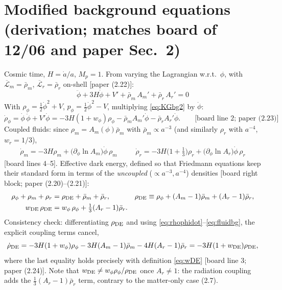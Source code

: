 \documentclass[11pt]{article}
\newcommand{\Lm}{\overline{\mathcal{L}}_{m}}
\newcommand{\Lr}{\overline{\mathcal{L}}_{r}}
\newcommand{\rhob}{\bar\rho}
\newcommand{\Am}{A_{m}}
\newcommand{\Ar}{A_{r}}
\begin{document}
\section{Modified background equations (derivation; matches board of 12/06 and paper Sec.~2)}

Cosmic time, $H=\dot a/a$, $M_p=1$. From varying the Lagrangian w.r.t.\ $\phi$,
with $\Lm=\rhob_m$, $\Lr=\rhob_r$ on-shell [paper (2.22)]:
\begin{equation}
\boxed{\;\ddot\phi+3H\dot\phi+V'+\rhob_m\,\Am'+\rhob_r\,\Ar'=0\;}
\label{eq:KGbg2}
\end{equation}
With $\rho_\phi=\tfrac12\dot\phi^2+V$, $p_\phi=\tfrac12\dot\phi^2-V$,
multiplying \eqref{eq:KGbg2} by $\dot\phi$:
\begin{equation}
\dot\rho_\phi=\dot\phi\,\ddot\phi+V'\dot\phi
=-3H(1+w_\phi)\rho_\phi-\rhob_m\Am'\dot\phi-\rhob_r\Ar'\dot\phi .
\qquad\text{[board line 2; paper (2.23)]}
\label{eq:rhophidot}
\end{equation}
Coupled fluids: since $\rho_m=\Am(\phi)\rhob_m$ with $\rhob_m\propto a^{-3}$
(and similarly $\rho_r$ with $a^{-4}$, $w_r=1/3$),
\begin{align}
\boxed{\;\dot\rho_m=-3H\rho_m+\big(\partial_\phi\ln \Am\big)\dot\phi\,\rho_m\;}
\qquad
\boxed{\;\dot\rho_r=-3H\Big(1+\tfrac13\Big)\rho_r+\big(\partial_\phi\ln \Ar\big)\dot\phi\,\rho_r\;}
\label{eq:fluidbg}
\end{align}
[board lines 4--5]. Effective dark energy, defined so that Friedmann equations keep
their standard form in terms of the \emph{uncoupled} ($\propto a^{-3},a^{-4}$)
densities [board right block; paper (2.20)--(2.21)]:
\begin{align}
\rho_\phi+\rho_m+\rho_r &= \rho_{\rm DE}+\rhob_m+\rhob_r ,
&\rho_{\rm DE}&\equiv\rho_\phi+(\Am-1)\rhob_m+(\Ar-1)\rhob_r ,
\\
w_{\rm DE}\,\rho_{\rm DE} &= w_\phi\,\rho_\phi+\tfrac13(\Ar-1)\rhob_r .
\label{eq:wDE}
\end{align}
Consistency check: differentiating $\rho_{\rm DE}$ and using
\eqref{eq:rhophidot}--\eqref{eq:fluidbg}, the explicit coupling terms cancel,
\begin{equation}
\dot\rho_{\rm DE}
=-3H(1+w_\phi)\rho_\phi-3H(\Am-1)\rhob_m-4H(\Ar-1)\rhob_r
=-3H(1+w_{\rm DE})\rho_{\rm DE},
\end{equation}
where the last equality holds precisely with definition \eqref{eq:wDE}
[board line 3; paper (2.24)]. Note that $w_{\rm DE}\neq w_\phi\rho_\phi/\rho_{\rm DE}$
once $\Ar\neq1$: the radiation coupling adds the $\tfrac13(\Ar-1)\rhob_r$ term,
contrary to the matter-only case (2.7).
\end{document}
